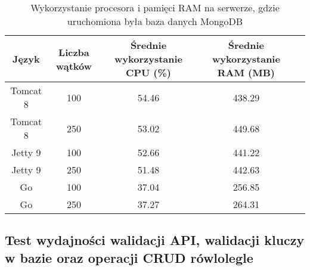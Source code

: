 \begin{table}[!htb]
\centering
\caption{Wykorzystanie procesora i pamięci RAM na serwerze, gdzie uruchomiona była baza danych MongoDB}
\label{tab:mongo-full-crud}
\begin{tabular}{@{}ccccl@{}}
\toprule
\textbf{Język} & \textbf{Liczba wątków} & \multicolumn{1}{p{3cm}}{\textbf{Średnie wykorzystanie CPU (\%)}} & \multicolumn{1}{p{3cm}}{\textbf{Średnie wykorzystanie RAM (MB)}} &  \\ \midrule
Tomcat 8       & 100                    & 54.46                             & 438.29                          &  \\
Tomcat 8       & 250                    & 53.02                             & 449.68                          &  \\
Jetty 9       & 100                    & 52.66                             & 441.22                          &  \\
Jetty 9       & 250                    & 51.48                             & 442.63                          &  \\
Go       & 100                    & 37.04                             & 256.85                          &  \\
Go       & 250                    & 37.27                             & 264.31                          &  \\
\bottomrule
\end{tabular}
\end{table}

 \newpage
 \subsection{Test wydajności walidacji API, walidacji kluczy w bazie oraz operacji CRUD rówlolegle }

 \clearpage

